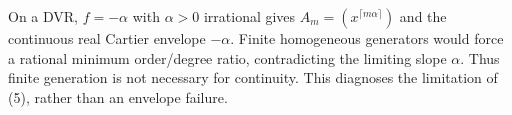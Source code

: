 On a DVR, $f=-\alpha$ with $\alpha>0$ irrational gives $A_m=(x^{\lceil m\alpha\rceil})$ and the continuous real Cartier envelope $-\alpha$. Finite homogeneous generators would force a rational minimum order/degree ratio, contradicting the limiting slope $\alpha$. Thus finite generation is not necessary for continuity. This diagnoses the limitation of (5), rather than an envelope failure.
